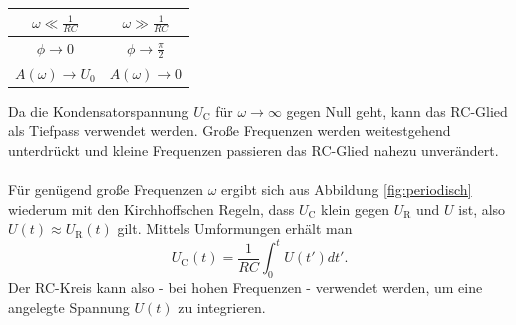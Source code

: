 \begin{table}
	\centering
	\label{tab:tab1}
	\begin{tabular}{cc}
		\toprule
		$\omega \ll \frac{1}{RC} $  & $ \omega \gg \frac{1}{RC}$ \\
		\midrule
		$\phi \to 0$                & $\phi \to \frac{\pi}{2}$   \\
		$A(\omega) \to U_\text{0} $ & $A(\omega) \to 0$          \\
		\bottomrule
	\end{tabular}
\end{table}

Da die Kondensatorspannung $U_{\text{C}}$ für $\omega \to \infty$ gegen Null geht, kann das RC-Glied als Tiefpass verwendet werden. Große Frequenzen werden weitestgehend unterdrückt und kleine Frequenzen passieren das RC-Glied nahezu unverändert. \\
\\Für genügend große Frequenzen  $\omega$ ergibt sich aus Abbildung \ref{fig:periodisch} wiederum mit den Kirchhoffschen Regeln, dass $U_\text{C}$ klein gegen $U_{\text{R}}$ und $U$ ist, also $U(t) \approx U_\text{R}(t)$ gilt.
Mittels Umformungen erhält man
\begin{equation}
	U_\text{C}(t)=\frac{1}{RC} \int_{0}^{t} U(t') dt' \text{.}
\end{equation}
Der RC-Kreis kann also - bei hohen Frequenzen - verwendet werden,  um eine angelegte Spannung $U(t)$ zu integrieren.
